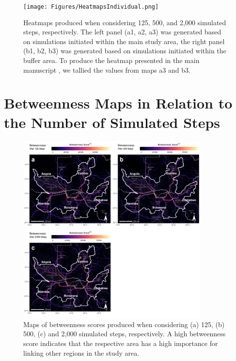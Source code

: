 \documentclass[../FinalThesis.tex]{subfiles}
\begin{document}
\begin{figure}[hbtp]
 \begin{center}
  \texttt{[image: Figures/HeatmapsIndividual.png]}
  \caption{Heatmaps produced when considering 125, 500, and 2,000 simulated
  steps, respectively. The left panel (a1, a2, a3) was generated based on
  simulations initiated within the main study area, the right panel (b1, b2, b3)
  was generated based on simulations initiated within the buffer area. To
  produce the heatmap presented in the main manuscript , we
  tallied the values from maps a3 and b3.} \label{HeatmapsIndividual}
  \end{center} \end{figure} \restoregeometry

\newpage
{}
\section{Betweenness Maps in Relation to the Number of Simulated Steps}

\begin{figure}[hbtp]
 \begin{center}
  \includegraphics[width = 0.86\textwidth]{Figures/BetweennessIndividual.png}
  \caption{Maps of betweenness scores produced when considering (a) 125, (b)
  500, (c) and 2,000 simulated steps, respectively. A high betweenness score
  indicates that the respective area has a high importance for linking other
  regions in the study area.} \label{BetweennessIndividual} \end{center}
  \end{figure} \restoregeometry
\end{document}
